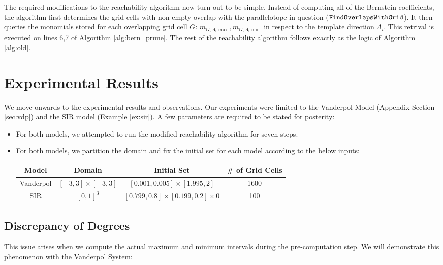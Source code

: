 The required modifications to the reachability algorithm now turn out to be simple. Instead of computing all of the Bernstein coefficients, the algorithm first determines the grid cells with non-empty overlap with the parallelotope in question ($\texttt{FindOverlapsWithGrid}$). It then queries the monomials stored for each overlapping grid cell $G$: $ m_{G,\Lambda_i\max}, m_{G,\Lambda_i \min}$ in respect to the template direction $\Lambda_i$. This retrival is executed on lines 6,7 of Algorithm \ref{alg:bern_prune}. The rest of the reachability algorithm follows exactly as the logic of Algorithm \ref{alg:old}.

\section{Experimental Results}
We move onwards to the experimental results and observations. Our experiments were limited to the Vanderpol Model (Appendix Section \ref{sec:vdp}) and the SIR model (Example \ref{ex:sir}). A few parameters are required to be stated for posterity:

\begin{itemize}
  \item For both models, we attempted to run the modified reachability algorithm for seven steps.
  \item For both models, we partition the domain and fix the initial set for each model according to the below inputs:

  \begin{tabular}{|c|c|c|c|}
  \hline
  Model & Domain & Initial Set & \# of Grid Cells \\
  \hline
  Vanderpol & $[-3, 3] \times [-3, 3]$ & $[0.001, 0.005]\times [1.995, 2]$ & 1600 \\
  \hline
  SIR & $[0, 1]^3$ & $[0.799,0.8] \times [0.199,0.2] \times 0$ & 100 \\
  \hline
  \end{tabular}
\end{itemize}

\subsection{Discrepancy of Degrees}
This issue arises when we compute the actual maximum and minimum intervals during the pre-computation step. We will demonstrate this phenomenon with the Vanderpol System:

